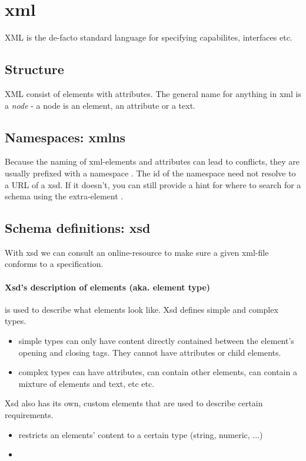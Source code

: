 \section{xml}

XML is the de-facto standard language for specifying capabilites, interfaces etc.

\subsection{Structure}
XML consist of elements with attributes. The general name for anything in xml is a \emph{node} - a node is an element, an attribute or a text. 

\subsection{Namespaces: xmlns}
Because the naming of xml-elements and attributes can lead to conflicts, they are usually prefixed with a namespace . The id of the namespace need not resolve to a URL of a xsd. If it doesn't, you can still provide a hint for where to search for a schema using the extra-element . 

\subsection{Schema definitions: xsd}
With xsd we can consult an online-resource to make sure a given xml-file conforms to a specification.

\paragraph{Xsd's description of elements (aka. element type)} is used to describe what elements look like. 
Xsd defines simple and complex types. 
\begin{itemize}
    \item {} simple types can only have content directly contained between the element’s opening and closing tags. They cannot have attributes or child elements.
    \item {} complex types can have attributes, can contain other elements, can contain a mixture of elements and text, etc etc.
\end{itemize}
Xsd also has its own, custom elements that are used to describe certain requirements.
\begin{itemize}
    \item {} restricts an elements' content to a certain type (string, numeric, ...)
    \item {}
\end{itemize} 

